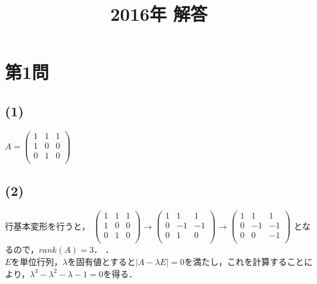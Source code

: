 \documentclass[uplatex]{jsarticle}
\title{2016年 解答}
\begin{document}
\section*{第1問}
\subsection*{(1)}

$
A =
\begin{pmatrix}
	1 & 1 & 1 \\
	1 & 0 & 0 \\
	0 & 1 & 0 \\
\end{pmatrix} $

\subsection*{(2)}
行基本変形を行うと，
$
\begin{pmatrix}
	1 & 1 & 1 \\
	1 & 0 & 0 \\
	0 & 1 & 0 \\
\end{pmatrix}
\rightarrow\begin{pmatrix}
	1 & 1 & 1 \\
	0 & -1 & -1 \\
	0 & 1 & 0 \\
\end{pmatrix}
\rightarrow\begin{pmatrix}
	1 & 1 & 1 \\
	0 & -1 & -1 \\
	0 & 0 & -1 \\
\end{pmatrix}
$
となるので，\underline{$rank(A) = 3$}． ．\\
$E$を単位行列，$\lambda$を固有値とすると$|A-\lambda E| = 0$を満たし，これを計算することにより，\underline{$\lambda^3 - \lambda^2 - \lambda - 1 = 0$}を得る．
\end{document}
